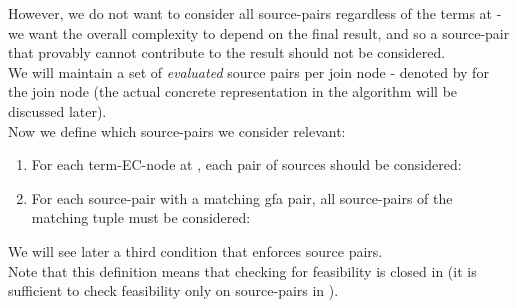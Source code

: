 However, we do not want to consider all  source-pairs regardless of the terms at  - 
we want the overall complexity to depend on the final result, and so a source-pair that provably cannot contribute to the result should not be considered.\\
We will maintain a set of \emph{evaluated} source pairs per join node - denoted by  for the join node  (the actual concrete representation in the algorithm will be discussed later).\\
Now we define which source-pairs we consider relevant:
\begin{enumerate}
	\item For each term-EC-node at , each pair of sources should be considered:\\
	\item For each source-pair with a matching gfa pair, all source-pairs of the matching tuple must be considered:\\
\end{enumerate}
We will see later a third condition that enforces source pairs.\\
Note that this definition means that checking for feasibility is closed in  (it is sufficient to check feasibility only on source-pairs in ).

